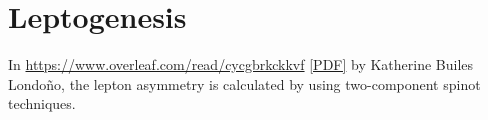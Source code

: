 \chapter{Leptogenesis}



In \url{https://www.overleaf.com/read/cycgbrkckkvf} \href{https://github.com/restrepo/beyond-the-standard-model/raw/master/Leptogenesis/main.pdf}{[PDF]} by Katherine Builes Londoño, the lepton asymmetry is calculated by using two-component spinot techniques.
